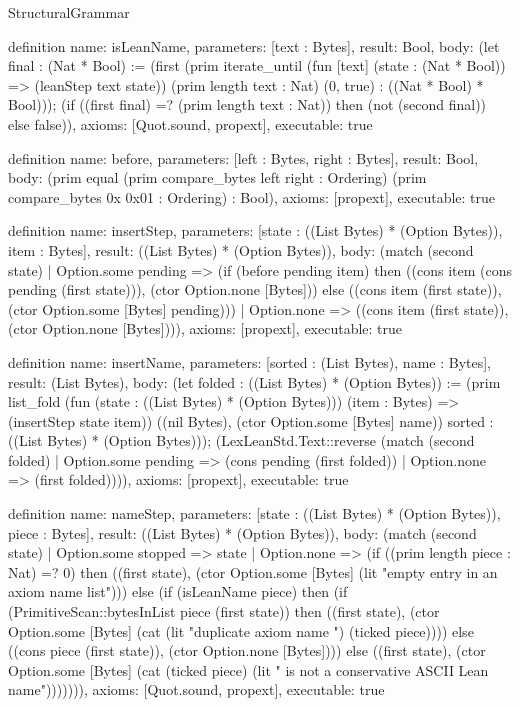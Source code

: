 \begin{lexlean}{StructuralGrammar}
\begin{semanticmodule}
{{definition{
  name: isLeanName,
  parameters: [text : Bytes],
  result: Bool,
  body: (let final : (Nat * Bool) := (first (prim iterate_until (fun [text] (state : (Nat * Bool)) => (leanStep text state)) (prim length text : Nat) (0, true) : ((Nat * Bool) * Bool))); (if ((first final) =? (prim length text : Nat)) then (not (second final)) else false)),
  axioms: [Quot.sound, propext],
  executable: true
}

definition{
  name: before,
  parameters: [left : Bytes, right : Bytes],
  result: Bool,
  body: (prim equal (prim compare_bytes left right : Ordering) (prim compare_bytes 0x 0x01 : Ordering) : Bool),
  axioms: [propext],
  executable: true
}

definition{
  name: insertStep,
  parameters: [state : ((List Bytes) * (Option Bytes)), item : Bytes],
  result: ((List Bytes) * (Option Bytes)),
  body: (match (second state)
    | Option.some pending => (if (before pending item) then ((cons item (cons pending (first state))), (ctor Option.none [Bytes])) else ((cons item (first state)), (ctor Option.some [Bytes] pending)))
    | Option.none => ((cons item (first state)), (ctor Option.none [Bytes]))),
  axioms: [propext],
  executable: true
}

definition{
  name: insertName,
  parameters: [sorted : (List Bytes), name : Bytes],
  result: (List Bytes),
  body: (let folded : ((List Bytes) * (Option Bytes)) := (prim list_fold (fun (state : ((List Bytes) * (Option Bytes))) (item : Bytes) => (insertStep state item)) ((nil Bytes), (ctor Option.some [Bytes] name)) sorted : ((List Bytes) * (Option Bytes))); (LexLeanStd.Text::reverse (match (second folded)
    | Option.some pending => (cons pending (first folded))
    | Option.none => (first folded)))),
  axioms: [propext],
  executable: true
}

definition{
  name: nameStep,
  parameters: [state : ((List Bytes) * (Option Bytes)), piece : Bytes],
  result: ((List Bytes) * (Option Bytes)),
  body: (match (second state)
    | Option.some stopped => state
    | Option.none => (if ((prim length piece : Nat) =? 0) then ((first state), (ctor Option.some [Bytes] (lit "empty entry in an axiom name list"))) else (if (isLeanName piece) then (if (PrimitiveScan::bytesInList piece (first state)) then ((first state), (ctor Option.some [Bytes] (cat (lit "duplicate axiom name ") (ticked piece)))) else ((cons piece (first state)), (ctor Option.none [Bytes]))) else ((first state), (ctor Option.some [Bytes] (cat (ticked piece) (lit " is not a conservative ASCII Lean name"))))))),
  axioms: [Quot.sound, propext],
  executable: true
}

}}
\end{semanticmodule}
\end{lexlean}
